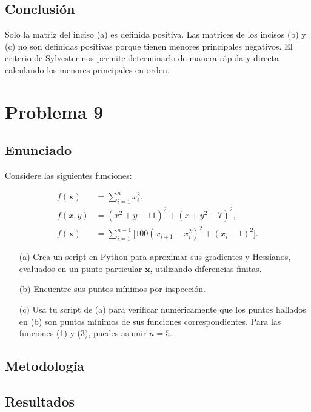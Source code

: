 \documentclass{article}
\begin{document}
\subsection{Conclusión}

Solo la matriz del inciso (a) es definida positiva. Las matrices de los incisos (b) y (c) no son definidas positivas porque tienen menores principales negativos. El criterio de Sylvester nos permite determinarlo de manera rápida y directa calculando los menores principales en orden.

\section{Problema 9}

\subsection{Enunciado}
\setcounter{equation}{0}
Considere las siguientes funciones:

\begin{align}
f(\mathbf{x}) &= \sum_{i=1}^{n} x_i^{2}, \label{eq:1}\\
f(x,y) &= (x^{2}+y-11)^{2} + (x+y^{2}-7)^{2}, \label{eq:2}\\
f(\mathbf{x}) &= \sum_{i=1}^{n-1} \bigl[100(x_{i+1}-x_i^{2})^{2} + (x_i-1)^{2}\bigr]. \label{eq:3}
\end{align}

\begin{enumerate}
  \item[(a)] Crea un script en Python para aproximar sus gradientes y Hessianos, evaluados en un punto particular $\mathbf{x}$, utilizando diferencias finitas.
  \item[(b)] Encuentre sus puntos mínimos por inspección.
  \item[(c)] Usa tu script de (a) para verificar numéricamente que los puntos hallados en (b) son puntos mínimos de sus funciones correspondientes. Para las funciones (1) y (3), puedes asumir $n=5$.
\end{enumerate}

\subsection{Metodología}

\subsection{Resultados}
\setcounter{equation}{0}
\end{document}
